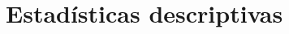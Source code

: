\documentclass[letterpaper, 12pt]{report}
\begin{document}
\section{Estadísticas descriptivas}


% 

%

%

%

\begin{doublespace}
  
  
\end{doublespace}
\end{document}

